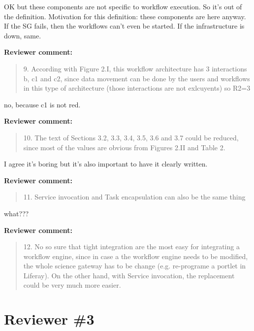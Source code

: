 \documentclass[a4]{article}
\newenvironment{review}%
{\textbf{Reviewer comment:}\begin{quote}}%
{\end{quote}}%
\newcommand{\todo}[1]{\color{red}#1\color{black}}
\begin{document}
\todo{OK but these components are not specific to workflow
  execution. So it's out of the definition. Motivation for this definition: these components are here anyway. If the SG fails, then the
  workflows can't even be started. If the infrastructure is down, same. }

\begin{review}
9. According with Figure 2.I, this workflow architecture has 3
interactions b, c1 and c2, since data movement can be done by the
users and workflows in this type of architecture (those interactions
are not exlcuyents) so R2=3
\end{review}

\todo{no, because c1 is not red.}

\begin{review}
  10. The text of Sections 3.2, 3.3, 3.4, 3.5, 3.6 and 3.7 could be
  reduced, since most of the values are obvious from Figures 2.II and
  Table 2.
\end{review}

\todo{I agree it's boring but it's also important to have it clearly written.}

\begin{review}
  11. Service invocation and Task encapsulation can also be the same
  thing
\end{review}

\todo{what???}

\begin{review}
12. No so sure that tight integration are the most easy for
integrating a workflow engine, since in case a the workflow engine
needs to be modified, the whole science gateway has to be change
(e.g. re-programe a portlet in Liferay). On the other hand, with
Service invocation, the replacement could be very much more easier.
\end{review}

\section{Reviewer \#3}
\end{document}

